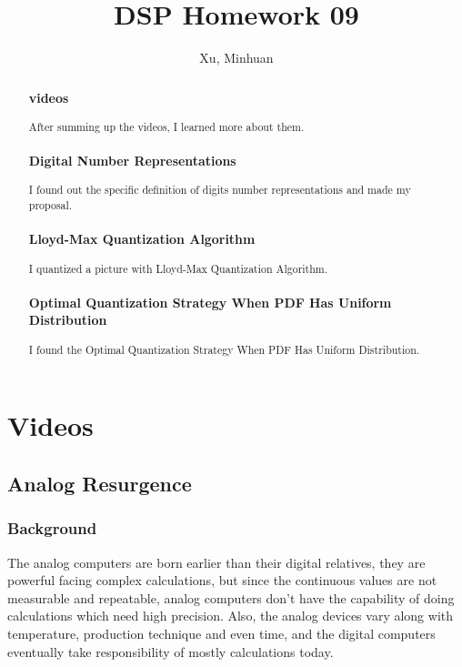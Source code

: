 \documentclass{article}
\begin{document}
\title{DSP Homework 09}
\author{Xu, Minhuan}
\maketitle
\tableofcontents
\begin{abstract}
\subsubsection*{videos}
After summing up the videos, I learned more about them.
\subsubsection*{Digital Number Representations}
I found out the specific definition of digits number representations and made my proposal.
\subsubsection*{Lloyd-Max Quantization Algorithm}
I quantized a picture with Lloyd-Max Quantization Algorithm.
\subsubsection*{Optimal Quantization Strategy When PDF Has Uniform Distribution}
I found the Optimal Quantization Strategy When PDF Has Uniform Distribution.
\end{abstract}

\section{Videos}
\subsection{Analog Resurgence}

\subsubsection{Background}
The analog computers are born earlier than their digital relatives, they are powerful facing complex calculations, but since the continuous values are not measurable and repeatable, analog computers don't have the capability of doing calculations which need high precision. Also, the analog devices vary along with temperature, production technique and even time, and the digital computers eventually take responsibility of mostly calculations today.
\end{document}
